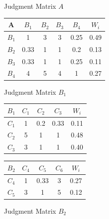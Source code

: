 \documentclass[12pt]{article}
\begin{document}
\begin{figure}[ht]
    \centering
    \begin{minipage}{0.45\textwidth}
        \centering
        \caption{Judgment Matrix $A$}
        \label{tab:judgment_matrix}
        \vspace{.4cm}
        \begin{tabular}{cccccc}
            \toprule
            A       & $B_{1}$ & $B_{2}$ & $B_{3}$ & $B_{4}$ & $W_{i}$ \\
            \midrule
            $B_{1}$ & 1       & 3       & 3       & 0.25    & 0.49    \\
            $B_{2}$ & 0.33    & 1       & 1       & 0.2     & 0.13    \\
            $B_{3}$ & 0.33    & 1       & 1       & 0.25    & 0.11    \\
            $B_{4}$ & 4       & 5       & 4       & 1       & 0.27    \\
            \bottomrule
        \end{tabular}
    \end{minipage}
    \begin{minipage}{0.45\textwidth}
        \centering
        \caption{Judgment Matrix $B_{1}$}
        \label{tab:judgment_matrix_1}
        \vspace{.4cm}
        \begin{tabular}{ccccc}
            \toprule
            $B_{1}$ & $C_{1}$ & $C_{2}$ & $C_{3}$ & $W_{i}$ \\
            \midrule
            $C_{1}$ & 1       & 0.2     & 0.33    & 0.11    \\
            $C_{2}$ & 5       & 1       & 1       & 0.48    \\
            $C_{3}$ & 3       & 1       & 1       & 0.40    \\
            \bottomrule
        \end{tabular}
    \end{minipage}
    \begin{minipage}{0.45\textwidth}
        \centering
        \caption{Judgment Matrix $B_{2}$}
        \label{tab:judgment_matrix_2}
        \vspace{.4cm}
        \begin{tabular}{ccccc}
            \toprule
            $B_{2}$ & $C_{4}$ & $C_{5}$ & $C_{6}$ & $W_{i}$ \\
            \midrule
            $C_{4}$ & 1       & 0.33    & 3       & 0.27    \\
            $C_{5}$ & 3       & 1       & 5       & 0.12    \\

\end{tabular}
\end{minipage}
\end{figure}
\end{document}
